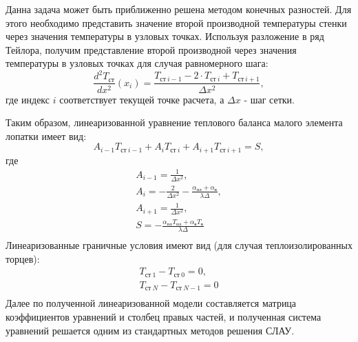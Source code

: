 \documentclass[a4paper,10pt]{article}
\begin{document}
    Данна задача может быть приближенно решена методом конечных разностей.
    Для этого необходимо представить значение второй производной температуры стенки через значения температуры в
    узловых точках.
    Используя разложение в ряд Тейлора, получим представление второй производной через значения температуры в
    узловых точках для случая равномерного шага:
    \[
        \frac{d^2 T_{ст}}{dx^2}(x_i) = \frac{T_{ст\ i-1} - 2 \cdot T_{ст\ i} + T_{ст\ i+1}}{\Delta x^2},
    \]
    где индекс $i$ соответствует текущей точке расчета, а $\Delta x$ - шаг сетки.

    Таким образом, линеаризованной уравнение теплового баланса малого элемента лопатки имеет вид:
    \[
        A_{i-1} T_{ст\ i-1} + A_{i} T_{ст\ i} + A_{i+1} T_{ст\ i+1} = S,
    \]
    где
    \begin{gather*}
        A_{i-1} = \frac{1}{\Delta x^2},\\
        A_i = -\frac{2}{\Delta x^2} - \frac{\alpha_{пл} + \alpha_в}{\lambda \Delta},\\
        A_{i+1} =\frac{1}{\Delta x^2},\\
        S = - \frac{\alpha_{пл} T_{пл} + \alpha_в T_в}{\lambda \Delta}\\
    \end{gather*}
    Линеаризованные граничные условия имеют вид (для случая теплоизолированных торцев):
    \begin{gather*}
        T_{ст\ 1} - T_{ст\ 0} = 0,\\
        T_{ст\ N} - T_{ст\ N-1} = 0\\
    \end{gather*}
    Далее по полученной линеаризованной модели составляется матрица коэффициентов уравнений и столбец правых частей,
    и полученная система уравнений решается одним из стандартных методов решения СЛАУ.

\end{document}
